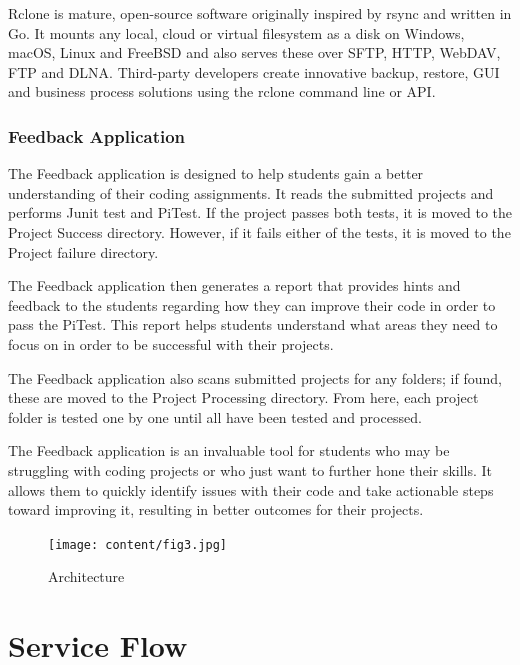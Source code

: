 Rclone is mature, open-source software originally inspired by rsync and written in Go. It mounts any local, cloud or virtual filesystem as a disk on Windows, macOS, Linux and FreeBSD and also serves these over SFTP, HTTP, WebDAV, FTP and DLNA. Third-party developers create innovative backup, restore, GUI and business process solutions using the rclone command line or API.

\subsubsection{Feedback Application}
The Feedback application is designed to help students gain a better understanding of their coding assignments. It reads the submitted projects and performs Junit test and PiTest. If the project passes both tests, it is moved to the Project Success directory. However, if it fails either of the tests, it is moved to the Project failure directory.\par 
The Feedback application then generates a report that provides hints and feedback to the students regarding how they can improve their code in order to pass the PiTest. This report helps students understand what areas they need to focus on in order to be successful with their projects. \par 
The Feedback application also scans submitted projects for any folders; if found, these are moved to the Project Processing directory. From here, each project folder is tested one by one until all have been tested and processed. \par 
The Feedback application is an invaluable tool for students who may be struggling with coding projects or who just want to further hone their skills. It allows them to quickly identify issues with their code and take actionable steps toward improving it, resulting in better outcomes for their projects.
\newpage
\begin{figure}[h!]
	\centering
	\texttt{[image: content/fig3.jpg]}
	\caption{Architecture}
	\label{fig:f11}
\end{figure}
\section{Service Flow}
